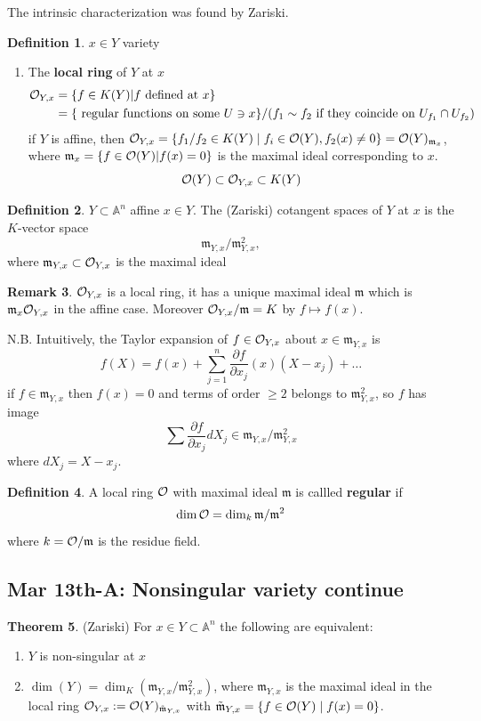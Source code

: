 \documentclass[11pt]{article}
\theoremstyle{definition}
\newtheorem{thm}{Theorem}[section]
\newtheorem{dfn}[thm]{Definition}
\newtheorem{rmk}[thm]{Remark}
\newcommand{\affn}{\mathbb A}
\newcommand{\scm}{{\mathfrak m}}
\newcommand{\calo}{{\cal O}}
\newcommand{\pd}{\partial}
\begin{document}
The intrinsic characterization was found by Zariski. 
\begin{dfn}
$x\in Y$ variety
\begin{enumerate}[label=(\arabic*)]
\item The \textbf{local ring} of $Y$ at $x$
$$
\begin{aligned}
\calo_{Y,x}&=\{f\in K(Y)|f\text{ defined  at } x\}\\
&=\{\text{ regular functions on some } U\ni x\}/(f_1\sim f_2\text{ if they coincide on } U_{f_1}\cap U_{f_2})
\end{aligned}
$$
if $Y$ is affine, then $\calo_{Y,x}=\{f_1/f_2\in K(Y) \mid f_i\in\calo(Y),f_2(x)\neq 0\}=\calo(Y)_{\scm_x}$, where $\scm_x=\{f\in\calo(Y)|f(x)=0\}$ is the maximal ideal corresponding to $x$.
$$
\calo(Y)\subset\calo_{Y,x}\subset K(Y)
$$
\end{enumerate}
\end{dfn}
\begin{dfn}
$Y\subset \affn^n$ affine $x\in Y$. The (Zariski) cotangent spaces of $Y$ at $x$ is the $K$-vector space
$$
\scm_{Y,x}/\scm_{Y,x}^2,
$$
where $\scm_{Y,x}\subset \calo_{Y,x}$ is the maximal ideal 
\end{dfn}
\begin{rmk}
$\calo_{Y,x}$ is a local ring, it has a unique maximal ideal $\scm$ which is $\scm_x\calo_{Y,x}$ in the affine case. Moreover $\calo_{Y,x}/\scm=K$ by $f\mapsto f(x)$.
\end{rmk}

N.B. Intuitively,  the Taylor expansion of $f\in \calo_{Y,x}$ about $x\in\scm_{Y,x}$ is
$$
f(X)=f(x)+\sum^n_{j=1}\frac{\pd f}{\pd x_j}(x)(X-x_j)+\dots
$$
if $f\in\scm_{Y,x}$ then $f(x)=0$ and terms of order $\geq 2$ belongs to $\scm_{Y,x}^2$, so $f$ has image
$$
\sum \frac{\pd f}{\pd x_j}dX_j\in \scm_{Y,x}/\scm_{Y,x}^2
$$
where $dX_j=X-x_j$.



\begin{dfn}
A local ring $\calo$ with maximal ideal $\scm$ is callled \textbf{regular} if 
$$
\dim \calo= \dim_k \scm/\scm^2
$$
where $k=\calo/\scm$ is the residue field.
\end{dfn}

\subsection{Mar 13th-A: Nonsingular variety continue}
\begin{thm}(Zariski)
	For $x\in Y\subset \affn^n$ the following are equivalent:
	\begin{enumerate}[label=(\arabic*)]
		\item
		$Y$ is non-singular at $x$
		\item $\dim(Y)=\dim_K(\scm_{Y,x}/\scm_{Y,x}^2)$, where $\scm_{Y,x}$ is the maximal ideal in the local ring $\calo_{Y,x}:=\calo(Y)_{\tilde{\scm}_{Y,x}}$ with $\tilde{\scm}_{Y,x}=\{f\in\calo(Y)\mid f(x)=0\}$.
	\end{enumerate}
\end{thm}
\end{document}
